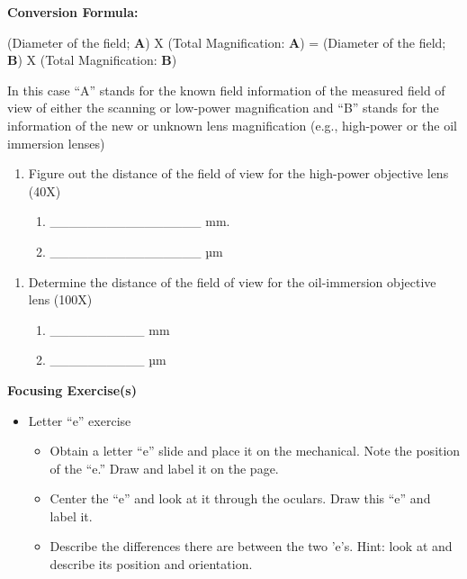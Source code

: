 \documentclass[
  letterpaper,
  DIV=11,
  numbers=noendperiod]{scrreprt}
\begin{document}
\textbf{Conversion Formula:}

(Diameter of the field; \textbf{A}) X (Total Magnification: \textbf{A})
= (Diameter of the field; \textbf{B}) X (Total Magnification:
\textbf{B})

In this case ``A'' stands for the known field information of the
measured field of view of either the scanning or low-power magnification
and ``B'' stands for the information of the new or unknown lens
magnification (e.g., high-power or the oil immersion lenses)

\begin{enumerate}
\def\labelenumi{\arabic{enumi}.}
\setcounter{enumi}{2}
\item
  Figure out the distance of the field of view for the high-power
  objective lens (40X)

  \begin{enumerate}
  \def\labelenumii{\alph{enumii})}
  \item
    \_\_\_\_\_\_\_\_\_\_\_\_\_\_\_\_ mm.
  \item
    \_\_\_\_\_\_\_\_\_\_\_\_\_\_\_\_ µm
  \end{enumerate}
\end{enumerate}

\begin{enumerate}
\def\labelenumi{\arabic{enumi}.}
\setcounter{enumi}{3}
\item
  Determine the distance of the field of view for the oil-immersion
  objective lens (100X)

  \begin{enumerate}
  \def\labelenumii{\alph{enumii})}
  \item
    \_\_\_\_\_\_\_\_\_\_ mm
  \item
    \_\_\_\_\_\_\_\_\_\_ µm
  \end{enumerate}
\end{enumerate}

\textbf{Focusing Exercise(s)}

\begin{itemize}
\item
  Letter ``e'' exercise

  \begin{itemize}
  \item
    Obtain a letter ``e'' slide and place it on the mechanical. Note the
    position of the ``e.'' Draw and label it on the page.
  \item
    Center the ``e'' and look at it through the oculars. Draw this ``e''
    and label it.
  \item
    Describe the differences there are between the two 'e's. Hint: look
    at and describe its position and orientation.
  \end{itemize}
\end{itemize}
\end{document}
